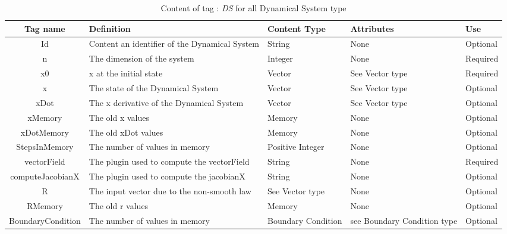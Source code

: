 \begin{table}[!hbp]
\begin{center}
\begin{tabular}{|c|p{6cm}|p{2cm}|p{2.5cm}|p{1.5cm}|}
\hline
\bf{Tag name} & \bf{Definition} & \bf{Content Type} & \bf{Attributes} & \bf{Use}
\\\hline
\hline
Id		  & Content an identifier of the Dynamical System & String & None &  Optional \\
\hline
n		  & The dimension of the system& Integer & None &  Required \\
\hline
x0	  	  & x at the initial state & Vector & See Vector type &  Required \\
\hline
x		  & The state of the Dynamical System & Vector & See Vector type &  Optional \\
\hline
xDot		  & The x derivative of the Dynamical System & Vector & See Vector type &  Optional \\
\hline
xMemory		  & The old x values & Memory & None &  Optional \\
\hline
xDotMemory	  & The old xDot values & Memory & None &  Optional \\
\hline
StepsInMemory	  & The number of values in memory & Positive Integer & None &  Optional \\
\hline
vectorField	  & The plugin used to compute the vectorField & String & None &  Required \\
\hline
computeJacobianX	  & The plugin used to compute the jacobianX & String & None &  Optional \\
\hline
R	  & The  input vector due to the non-smooth law & See Vector type & None &  Optional \\
\hline
RMemory	  & The old r values & Memory & None &  Optional \\
\hline
BoundaryCondition	  & The number of values in memory & Boundary Condition & see Boundary Condition type &  Optional \\
\hline
\end{tabular}
\end{center}
\caption{Content of tag : \textit{DS} for all Dynamical System type}
\label{tab-NLSDS}
\end{table}


